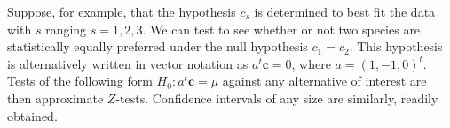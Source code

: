Suppose, for example, that the hypothesis $c_s$ is determined to best fit the data with $s$ ranging $s = 1, 2, 3$.  We can test to see whether or not two species are statistically equally preferred under the null hypothesis $c_{1} = c_{2}$.  This hypothesis is alternatively written in vector notation as $a^t\mathbf{c} = 0$, where $a = (1, -1, 0)^t$.  Tests of the following form $H_0: a^t\mathbf{c} = \mu$ against any alternative of interest are then approximate $Z$-tests.  Confidence intervals of any size are similarly, readily obtained. 


